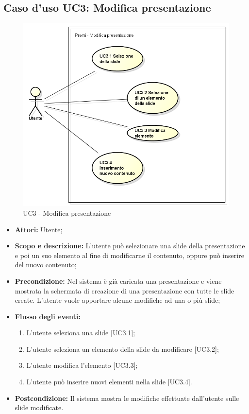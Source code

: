 \subsection{Caso d'uso UC3: Modifica presentazione}
\begin{figure}[h] 
	\centering 
	\includegraphics[scale=0.45] {img/UC3.png} 
	\caption{UC3 - Modifica presentazione} 
\end{figure}

\begin{itemize}
	\item \textbf{Attori:} Utente;
	\item \textbf{Scopo e descrizione:} L'utente può selezionare una slide della presentazione e poi un suo elemento al fine di modificarne il contenuto, oppure può inserire del nuovo contenuto;
	\item \textbf{Precondizione:} Nel sistema è già caricata una presentazione e viene mostrata la schermata di creazione di una presentazione con tutte le slide create. L'utente vuole apportare alcune modifiche ad una o più slide;
	\item \textbf{Flusso degli eventi:}
	\begin{enumerate}
		\item L'utente seleziona una slide [UC3.1];
		\item L'utente seleziona un elemento della slide da modificare [UC3.2];
		\item L'utente modifica l'elemento [UC3.3];
		\item L'utente può inserire nuovi elementi nella slide [UC3.4].
	\end{enumerate}
	\item \textbf{Postcondizione:} Il sistema mostra le modifiche effettuate dall'utente sulle slide modificate.
\end{itemize}

